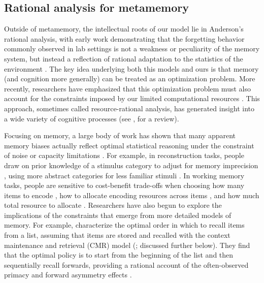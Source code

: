 \subsection{Rational analysis for metamemory}

Outside of metamemory, the intellectual roots of our model lie in Anderson's \citeyearpar{anderson1990adaptive} rational analysis, with early work demonstrating that the forgetting behavior commonly observed in lab settings is not a weakness or peculiarity of the memory system, but instead a reflection of rational adaptation to the statistics of the environment \citep{anderson1989human}. The key idea underlying both this models and ours is that memory (and cognition more generally) can be treated as an optimization problem. More recently, researchers have emphasized that this optimization problem must also account for the constraints imposed by our limited computational resources \citep{griffiths2015rational,howes2009rational,lewis2014computational,gershman2015computational}. This approach, sometimes called resource-rational analysis, has generated insight into a wide variety of cognitive processes (see \citealp{lieder2020resourcerational}, for a review).

Focusing on memory, a large body of work has shown that many apparent memory biases actually reflect optimal statistical reasoning under the constraint of noise or capacity limitations \citep{gershman2021rational}. For example, in reconstruction tasks, people draw on prior knowledge of a stimulus category to adjust for memory imprecision \citep{huttenlocher2000categories}, using more abstract categories for less familiar stimuli \citep{hemmer2009bayesian}. In working memory tasks, people are sensitive to cost-benefit trade-offs when choosing how many items to encode \citep{howes2016predicting}, how to allocate encoding resources across items \citep{yoo2018strategic}, and how much total resource to allocate \citep{vandenberg2018resourcerational}. Researchers have also begun to explore the implications of the constraints that emerge from more detailed models of memory. For example, \citet{zhang2022optimal} characterize the optimal order in which to recall items from a list, assuming that items are stored and recalled with the context maintenance and retrieval (CMR) model (\citealp{polyn2009context}; discussed further below). They find that the optimal policy is to start from the beginning of the list and then sequentially recall forwards, providing a rational account of the often-observed primacy and forward asymmetry effects \citep{zhang2022optimal}.

